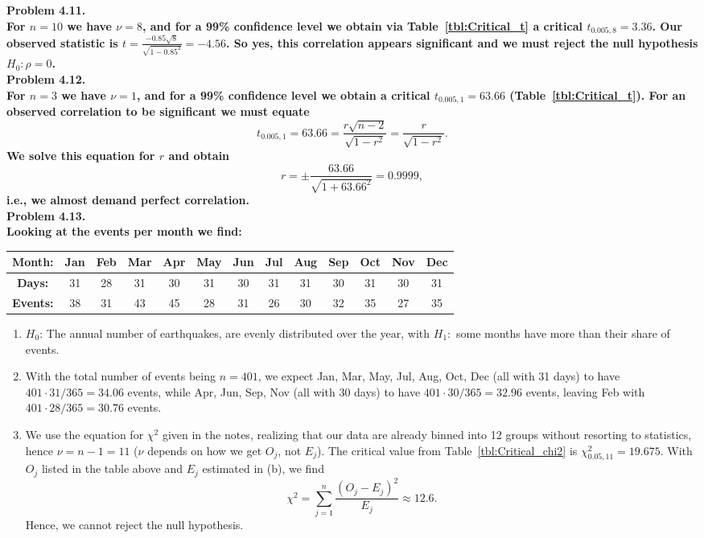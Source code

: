 \noindent
\bf{Problem 4.11.} \\

For $n = 10$ we have $\nu = 8$, and for a 99\% confidence level we obtain via Table~\ref{tbl:Critical_t} a critical $t_{0.005,8} = 3.36$.
Our observed statistic is $t = \frac{-0.85\sqrt{8}}{\sqrt{1-0.85^2}} = -4.56$.  So yes, this correlation
appears significant and we must reject the null hypothesis $H_0: \rho = 0$.
\\

\noindent
\bf{Problem 4.12.} \\

For $n = 3$ we have $\nu = 1$, and for a 99\% confidence level we obtain a critical $t_{0.005,1} = 63.66$ (Table~\ref{tbl:Critical_t}).
For an observed correlation to be significant we must equate
$$
t_{0.005,1} = 63.66 = \frac{r\sqrt{n-2}}{\sqrt{1-r^2}} = \frac{r}{\sqrt{1-r^2}}.
$$
We solve this equation for $r$ and obtain
$$
r = \pm \frac{63.66}{\sqrt{1+63.66^2}}=0.9999,
$$
i.e., we almost demand perfect correlation.
\\

\noindent
\bf{Problem 4.13.} \\

Looking at the events per month we find:
\begin{table}[H]
\centering
\begin{tabular}{|c||c|c|c|c|c|c|c|c|c|c|c|c|} \hline
\bf{Month:} & \bf{Jan} & \bf{Feb} & \bf{Mar} & \bf{Apr} & \bf{May} & \bf{Jun} & \bf{Jul} & \bf{Aug} & \bf{Sep} & \bf{Oct} & \bf{Nov} & \bf{Dec} \\ \hline
\bf{Days:} & 31 & 28 & 31 & 30 & 31 & 30 & 31 & 31 & 30 & 31 & 30 & 31 \\ \hline
\bf{Events:} & 38 & 31 & 43 & 45 & 28 & 31 & 26 & 30 & 32 & 35 & 27 & 35 \\ \hline
\end{tabular}
\end{table}
\begin{enumerate}[label=\alph*)]
	\item $H_0$: The annual number of earthquakes, are evenly distributed over
	the year, with $H_1:$ some months have more than their share of events.
	\item With the total
	number of events being $n = 401$, we expect Jan, Mar, May, Jul, Aug, Oct, Dec (all with 31 days)
	to have $401\cdot 31 / 365 = 34.06$ events, while Apr, Jun, Sep, Nov (all with 30 days) to
	have $401\cdot 30 / 365 = 32.96$ events, leaving Feb with $401 \cdot 28 / 365 = 30.76$ events.
	\item We use the equation for $\chi^2$ given in the notes, realizing that our data are already
	binned into 12 groups without resorting to statistics, hence $\nu = n - 1 = 11$ ($\nu$ depends
	on how we get $O_j$, not $E_j$).
	The critical value from Table~\ref{tbl:Critical_chi2} is $\chi^2_{0.05,11} = 19.675$.
	With $O_j$ listed in the table above and $E_j$ estimated in (b), we find
	\[
	        \chi^2=\sum^n_{j=1}\frac{(O_j-E_j)^2}{E_j} \approx 12.6.
	\]
	Hence, we cannot reject the null hypothesis.
\end{enumerate}


